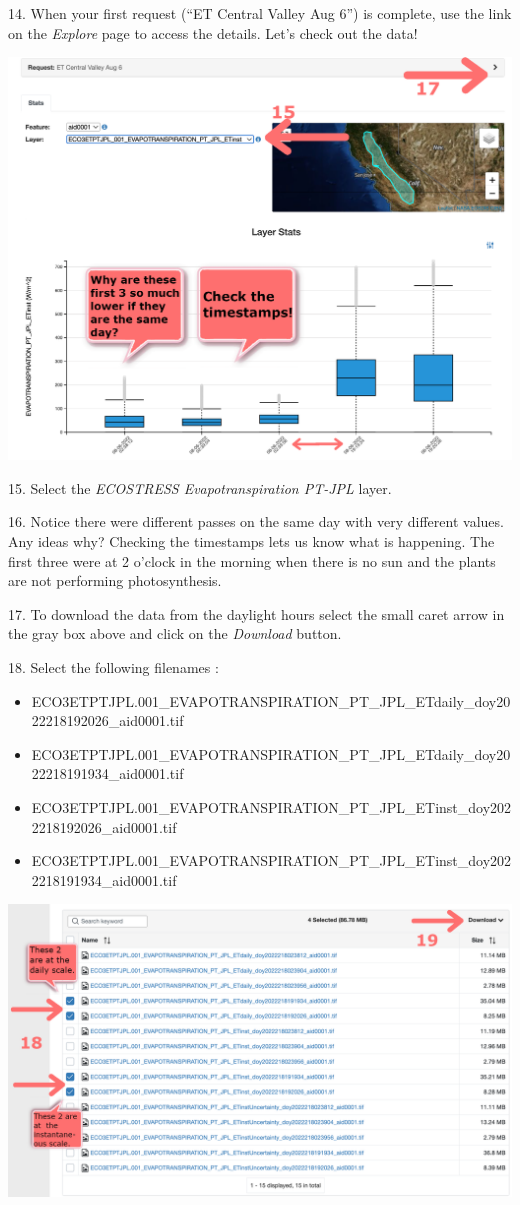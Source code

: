 \documentclass[oneside,a4paper,11pt,explicit]{book}
\begin{document}
14. When your first request (``ET Central Valley Aug 6'') is complete, use the link on the \textit{Explore} page to access the details. Let's check out the data!

\vspace{.5em}

\centerline{\includegraphics[width=.6\textwidth]{ETinstDataCheck.png}}

\vspace{.5em}

15. Select the \textit{ECOSTRESS Evapotranspiration PT-JPL} layer.

16. Notice there were different passes on the same day with very different values. Any ideas why? Checking the timestamps lets us know what is happening. The first three were at 2 o'clock in the morning when there is no sun and the plants are not performing photosynthesis.

17. To download the data from the daylight hours select the small caret arrow in the gray box above and click on the \textit{Download} button.


18. Select the following filenames :

\begin{itemize}
	\item ECO3ETPTJPL.001\_EVAPOTRANSPIRATION\_PT\_JPL\_ETdaily\_doy2022218192026\_aid0001.tif
	\item ECO3ETPTJPL.001\_EVAPOTRANSPIRATION\_PT\_JPL\_ETdaily\_doy2022218191934\_aid0001.tif
	\item ECO3ETPTJPL.001\_EVAPOTRANSPIRATION\_PT\_JPL\_ETinst\_doy2022218192026\_aid0001.tif
	\item ECO3ETPTJPL.001\_EVAPOTRANSPIRATION\_PT\_JPL\_ETinst\_doy2022218191934\_aid0001.tif
\end{itemize}

\vspace{.5em}

\centerline{\includegraphics[width=.8\textwidth]{ETdownload.png}}
\end{document}
